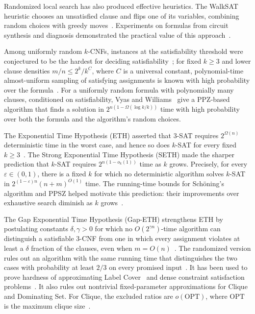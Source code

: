 \documentclass[11pt,reqno]{amsart}
\numberwithin{equation}{section}
\theoremstyle{definition}\newtheorem{definition}[theorem]{Definition}
\theoremstyle{remark}\newtheorem{remark}[theorem]{Remark}
\renewcommand{\le}{\leqslant}
\renewcommand{\ge}{\geqslant}
\begin{document}
Randomized local search has also produced effective heuristics.
The WalkSAT heuristic chooses an
unsatisfied clause and flips one of its variables, combining random
choices with greedy moves~\cite{SKC94}. Experiments on formulas
from circuit synthesis and diagnosis demonstrated the practical value
of this approach~\cite[pp.~340--342, Tables~4--5]{SKC94}.

Among uniformly random $k$-CNFs, instances at the satisfiability
threshold were conjectured to be the hardest for deciding satisfiability~\cite[Section~1]{VW21};
for fixed $k\ge3$ and lower clause densities $m/n\le 2^k/k^C$,
where $C$ is a universal constant,
polynomial-time almost-uniform sampling of satisfying assignments is
known with high probability over the formula~\cite[Theorem~1.2]{CLWYY25}.
For a uniformly random formula with polynomially many clauses,
conditioned on satisfiability, Vyas and Williams~\cite[Theorem~3]{VW21} give a PPZ-based
algorithm that finds a solution in $2^{n(1-\Omega(\log k/k))}$ time with high
probability over both the formula and the algorithm's random choices.

The Exponential Time Hypothesis (ETH) asserted that $3$-SAT requires
$2^{\Omega(n)}$ deterministic time in the worst case, and hence so does
$k$-SAT for every fixed $k\ge3$~\cite[Theorem~1]{IP01}.
The Strong Exponential Time Hypothesis (SETH) made the sharper
prediction that $k$-SAT requires $2^{n(1-o_k(1))}$ time as $k$ grows.
Precisely, for every $\varepsilon\in(0,1)$, there is a fixed $k$ for
which no deterministic algorithm solves $k$-SAT in
$2^{(1-\varepsilon)n}(n+m)^{O(1)}$ time.
The running-time bounds for Sch\"oning's algorithm and PPSZ helped
motivate this prediction: their improvements over exhaustive search
diminish as $k$ grows~\cite[Open Problems, item~2]{IP01}.

The Gap Exponential Time Hypothesis (Gap-ETH) strengthens ETH by
postulating constants $\delta,\gamma>0$ for which no $O(2^{\gamma n})$-time
algorithm can distinguish a satisfiable $3$-CNF from one in which
every assignment violates at least a $\delta$ fraction of the clauses,
even when $m=O(n)$~\cite{Din16,MR17}. The randomized version rules
out an algorithm with the same running time that distinguishes the
two cases with probability at least $2/3$ on every promised
input~\cite[Conjecture~2.5]{CCK20}.
It has been used to prove hardness of approximating Label
Cover~\cite{Din16} and dense constraint satisfaction
problems~\cite{MR17}. It also rules out nontrivial fixed-parameter
approximations for Clique and Dominating Set. For Clique, the excluded
ratios are $o(\mathrm{OPT})$, where $\mathrm{OPT}$ is the maximum
clique size~\cite[Corollaries~5.3 and~5.6]{CCK20}.
\end{document}
